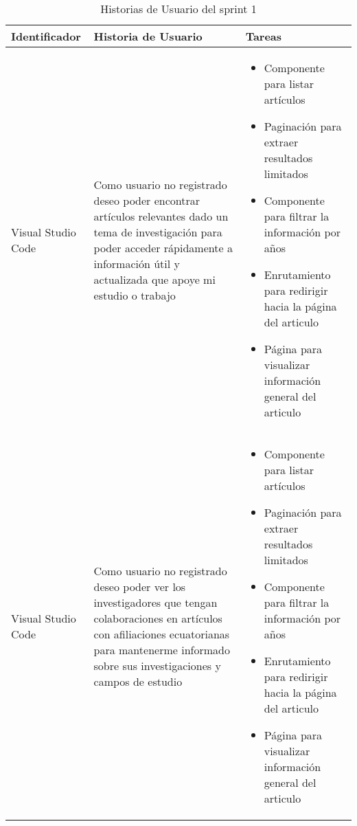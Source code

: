 \begin{table}[H]
    \centering
    \begin{tabular}{|m{2.5cm}|m{5cm}|m{6cm}|}
        \hline
        \textbf{Identificador} &  \textbf{Historia de Usuario} & \textbf{Tareas} \\
        
        \hline
        Visual Studio Code & Como usuario no registrado deseo poder encontrar artículos relevantes dado un  tema de investigación para poder acceder rápidamente a información útil y actualizada que apoye mi estudio o trabajo  &  
        \begin{itemize}
            \item Componente para listar \break artículos
            \item Paginación para extraer resultados limitados
            \item Componente para filtrar la \break información por años
            \item Enrutamiento para redirigir hacia la página del articulo
            \item Página para visualizar \break información general del articulo
            
        \end{itemize} 
        \\
        \hline
          Visual Studio Code & Como usuario no registrado deseo poder ver los investigadores que tengan colaboraciones en artículos con afiliaciones ecuatorianas para mantenerme informado sobre sus investigaciones y campos de estudio &  
        \begin{itemize}
            \item Componente para listar artículos
            \item Paginación para extraer resultados limitados
            \item Componente para filtrar la información por años
            \item Enrutamiento para redirigir hacia  la página del articulo
            \item Página para visualizar información general del articulo

            
        \end{itemize} 
        \\
        \hline
        
    \end{tabular}
    \caption{Historias de Usuario del sprint 1}
    \label{C2T1:Historias de Usuario del Sprint 1}
\end{table}
